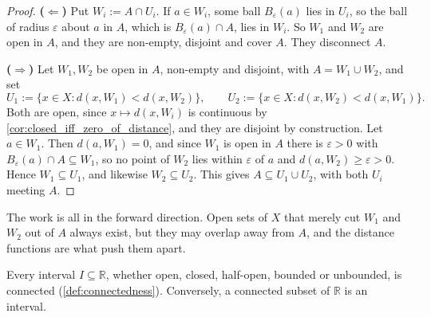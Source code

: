 \begin{proof}
\textbf{($\Leftarrow$)} Put $W_i := A \cap U_i$. If $a \in W_i$, some ball $B_\varepsilon(a)$
lies in $U_i$, so the ball of radius $\varepsilon$ about $a$ in $A$, which is
$B_\varepsilon(a) \cap A$, lies in $W_i$. So $W_1$ and $W_2$ are open in $A$, and they are
non-empty, disjoint and cover $A$. They disconnect $A$.

\textbf{($\Rightarrow$)} Let $W_1, W_2$ be open in $A$, non-empty and disjoint, with
$A = W_1 \cup W_2$, and set
\[U_1 := \{x \in X : d(x,W_1) < d(x,W_2)\}, \qquad U_2 := \{x \in X : d(x,W_2) < d(x,W_1)\}.\]
Both are open, since $x \mapsto d(x,W_i)$ is continuous by
\cref{cor:closed_iff_zero_of_distance}, and they are disjoint by construction. Let
$a \in W_1$. Then $d(a,W_1) = 0$, and since $W_1$ is open in $A$ there is $\varepsilon>0$ with
$B_\varepsilon(a) \cap A \subseteq W_1$, so no point of $W_2$ lies within $\varepsilon$ of $a$
and $d(a,W_2) \geq \varepsilon > 0$. Hence $W_1 \subseteq U_1$, and likewise
$W_2 \subseteq U_2$. This gives $A \subseteq U_1 \cup U_2$, with both $U_i$ meeting $A$.
\end{proof}

The work is all in the forward direction. Open sets of $X$ that merely cut $W_1$ and $W_2$ out of
$A$ always exist, but they may overlap away from $A$, and the distance functions are what push
them apart.

\begin{proposition}
\label{prop:intervals_connected}
Every interval $I \subseteq \mathbb{R}$, whether open, closed, half-open, bounded or unbounded,
is connected (\cref{def:connectedness}). Conversely, a connected subset of $\mathbb{R}$ is an
interval.
\end{proposition}

